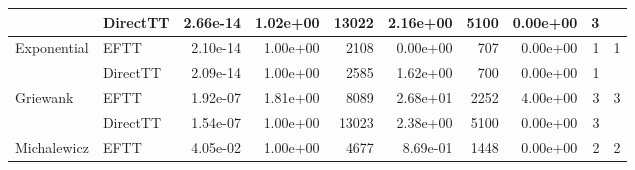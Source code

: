 \begin{table}[!ht]
{\begin{tabular}{llrrrrrrrr}
                                   & DirectTT                        & 2.66e-14                    & 1.02e+00                                           & 13022                          & 2.16e+00                                            & 5100                          & 0.00e+00                                         & 3                                        &                                          \\ \hline
    \multirow{2}{*}{Exponential}   & EFTT                            & 2.10e-14                    & 1.00e+00                                           & 2108                           & 0.00e+00                                            & 707                           & 0.00e+00                                         & 1                                        & 1                                        \\ %
                                   & DirectTT                        & 2.09e-14                    & 1.00e+00                                           & 2585                           & 1.62e+00                                            & 700                           & 0.00e+00                                         & 1                                        &                                          \\ \hline
    \multirow{2}{*}{Griewank}      & EFTT                            & 1.92e-07                    & 1.81e+00                                           & 8089                           & 2.68e+01                                            & 2252                          & 4.00e+00                                         & 3                                        & 3                                        \\ %
                                   & DirectTT                        & 1.54e-07                    & 1.00e+00                                           & 13023                          & 2.38e+00                                            & 5100                          & 0.00e+00                                         & 3                                        &                                          \\ \hline
    \multirow{2}{*}{Michalewicz}   & EFTT                            & 4.05e-02                    & 1.00e+00                                           & 4677                           & 8.69e-01                                            & 1448                          & 0.00e+00                                         & 2                                        & 2                                        \\ %

\end{tabular}}
\end{table}
